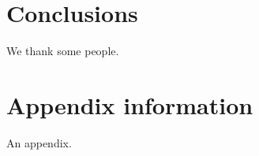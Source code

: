 \documentclass[twocolumn]{aastex63}
\begin{document}
\section{Conclusions} \label{sec:conclusions}


\acknowledgments

We thank some people.

%

\vspace{5mm}





\appendix

\section{Appendix information}

An appendix.

{}



\end{document}
